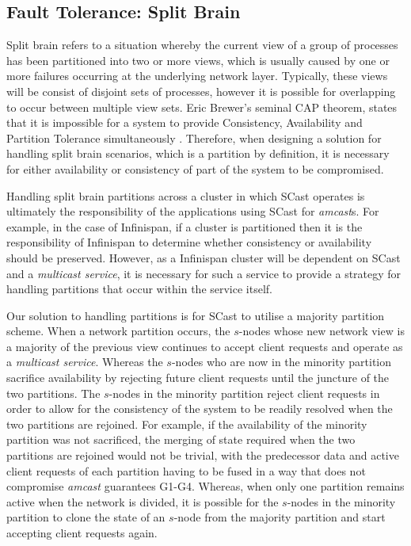    \subsection{Fault Tolerance: Split Brain}
    Split brain refers to a situation whereby the current view of a group of processes has been partitioned into two or more views, which is usually caused by one or more failures occurring at the underlying network layer. Typically, these views will be consist of disjoint sets of processes, however it is possible for overlapping to occur between multiple view sets.  Eric Brewer's seminal CAP theorem, states that it is impossible for a system to provide Consistency, Availability and Partition Tolerance simultaneously \citep{Brewer:2000:TRD:343477.343502,6133253, Gilbert:2002:BCF:564585.564601}.  Therefore, when designing a solution for handling split brain scenarios, which is a partition by definition, it is necessary for either availability or consistency of part of the system to be compromised.  
    
    Handling split brain partitions across a cluster in which \textsf{SCast} operates is ultimately the responsibility of the applications using \textsf{SCast} for \emph{amcast}s.  For example, in the case of Infinispan, if a cluster is partitioned then it is the responsibility of Infinispan to determine whether consistency or availability should be preserved.  However, as a Infinispan cluster will be dependent on \textsf{SCast} and a \emph{multicast service}, it is necessary for such a service to provide a strategy for handling partitions that occur within the service itself.  
    
    Our solution to handling partitions is for \textsf{SCast} to utilise a majority partition scheme.  When a network partition occurs, the $s$-nodes whose new network view is a majority of the previous view continues to accept client requests and operate as a \emph{multicast service}.  Whereas the $s$-nodes who are now in the minority partition sacrifice availability by rejecting future client requests until the juncture of the two partitions.  The $s$-nodes in the minority partition reject client requests in order to allow for the consistency of the system to be readily resolved when the two partitions are rejoined.  For example, if the availability of the minority partition was not sacrificed, the merging of state required when the two partitions are rejoined would not be trivial, with the predecessor data and active client requests of each partition having to be fused in a way that does not compromise \emph{amcast} guarantees G1-G4.  Whereas, when only one partition remains active when the network is divided, it is possible for the $s$-nodes in the minority partition to clone the state of an $s$-node from the majority partition and start accepting client requests again.  
    

